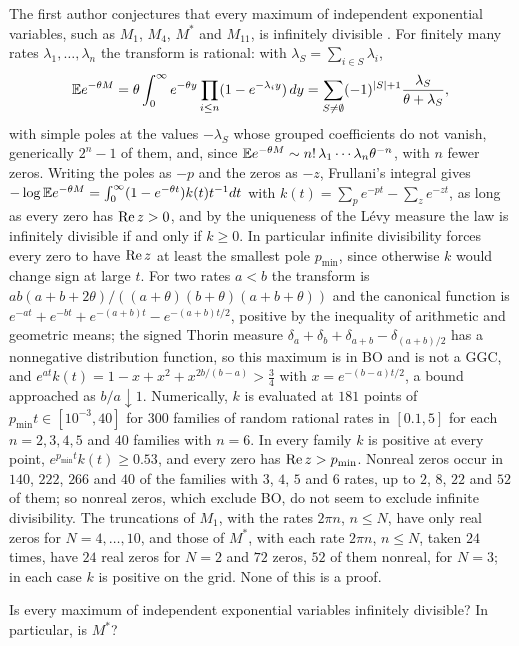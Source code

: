 The first author conjectures that every maximum of independent exponential variables, such as $M_1$, $M_4$, $M^*$ and $M_{11}$, is infinitely divisible \cite{P26max}. For finitely many rates $\lambda_1,\dots,\lambda_n$ the transform is rational: with $\lambda_S=\sum_{i\in S}\lambda_i$,
\[
\mathbb{E} e^{-\theta M}=\theta\int_0^\infty e^{-\theta y}\prod_{i\le n}(1-e^{-\lambda_iy})\,dy=\sum_{S\ne\emptyset}(-1)^{|S|+1}\frac{\lambda_S}{\theta+\lambda_S},
\]
with simple poles at the values $-\lambda_S$ whose grouped coefficients do not vanish, generically $2^n-1$ of them, and, since $\mathbb{E} e^{-\theta M}\sim n!\,\lambda_1\cdots\lambda_n\theta^{-n}$, with $n$ fewer zeros. Writing the poles as $-p$ and the zeros as $-z$, Frullani's integral gives $-\log\mathbb{E} e^{-\theta M}=\int_0^\infty(1-e^{-\theta t})k(t)t^{-1}dt$ with $k(t)=\sum_pe^{-pt}-\sum_ze^{-zt}$, as long as every zero has $\operatorname{Re} z>0$, and by the uniqueness of the L\'evy measure the law is infinitely divisible if and only if $k\ge0$. In particular infinite divisibility forces every zero to have $\operatorname{Re} z$ at least the smallest pole $p_{\min}$, since otherwise $k$ would change sign at large $t$. For two rates $a<b$ the transform is $ab(a+b+2\theta)/((a+\theta)(b+\theta)(a+b+\theta))$ and the canonical function is $e^{-at}+e^{-bt}+e^{-(a+b)t}-e^{-(a+b)t/2}$, positive by the inequality of arithmetic and geometric means; the signed Thorin measure $\delta_a+\delta_b+\delta_{a+b}-\delta_{(a+b)/2}$ has a nonnegative distribution function, so this maximum is in BO and is not a GGC, and $e^{at}k(t)=1-x+x^2+x^{2b/(b-a)}>\frac34$ with $x=e^{-(b-a)t/2}$, a bound approached as $b/a\downarrow1$. Numerically, $k$ is evaluated at $181$ points of $p_{\min}t\in[10^{-3},40]$ for $300$ families of random rational rates in $[0.1,5]$ for each $n=2,3,4,5$ and $40$ families with $n=6$. In every family $k$ is positive at every point, $e^{p_{\min}t}k(t)\ge0.53$, and every zero has $\operatorname{Re} z>p_{\min}$. Nonreal zeros occur in $140$, $222$, $266$ and $40$ of the families with $3$, $4$, $5$ and $6$ rates, up to $2$, $8$, $22$ and $52$ of them; so nonreal zeros, which exclude BO, do not seem to exclude infinite divisibility. The truncations of $M_1$, with the rates $2\pi n$, $n\le N$, have only real zeros for $N=4,\dots,10$, and those of $M^*$, with each rate $2\pi n$, $n\le N$, taken $24$ times, have $24$ real zeros for $N=2$ and $72$ zeros, $52$ of them nonreal, for $N=3$; in each case $k$ is positive on the grid. None of this is a proof.

\begin{question}\label{q:maxexp:id}
Is every maximum of independent exponential variables infinitely divisible? In particular, is $M^*$?
\end{question}

